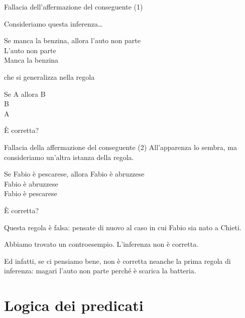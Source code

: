 \documentclass[aspectratio=169,10pt,dvipsnames,handout]{beamer}
\begin{document}
\begin{frame}{Fallacia dell'affermazione del conseguente (1)}

	Consideriamo questa inferenza\ldots
	\begin{center}
		\begin{inference}
			Se manca la benzina, allora l'auto non parte\\
			L'auto non parte\\
			\hline
			Manca la benzina
		\end{inference}
	\end{center}
	che si generalizza nella regola
	\begin{center}
		\begin{inference}
			Se A allora B\\
			B\\
			\hline
			A
		\end{inference}
	\end{center}
	È corretta?
\end{frame}

\begin{frame}{Fallacia della affermazione del conseguente (2)}
	All'apparenza lo sembra, ma consideriamo un'altra istanza della regola.
	\begin{center}
		\begin{inference}
			Se Fabio è pescarese, allora Fabio è abruzzese\\
			Fabio è abruzzese\\
			\hline
			Fabio è pescarese
		\end{inference}
	\end{center}
	È corretta?

	\pause
	\medskip
	Questa regola è falsa: pensate di nuovo al caso in cui Fabio sia nato a Chieti.

	\medskip
	Abbiamo trovato un \alert{controesempio}. L'inferenza non è corretta.

	\medskip
	Ed infatti, se ci pensiamo bene, non è corretta neanche la prima regola di inferenza: magari l'auto non parte perché è scarica la batteria.
\end{frame}


\section{Logica dei predicati}

\end{document}
